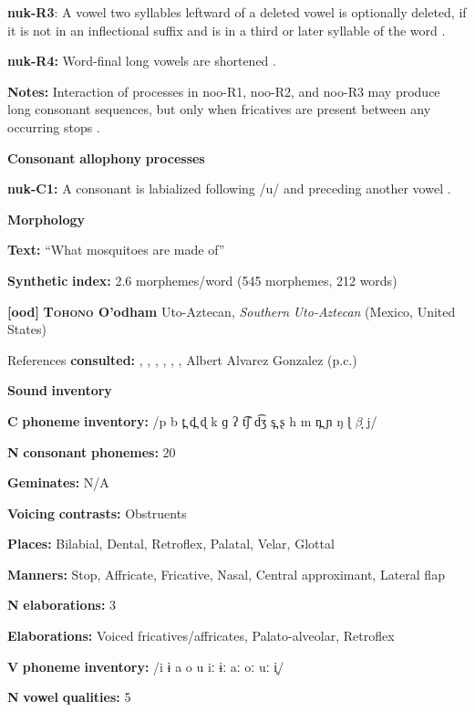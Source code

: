 \textbf{nuk-R3}: A vowel two syllables leftward of a deleted vowel is optionally deleted, if it is not in an inflectional suffix and is in a third or later syllable of the word \citep[25]{Rose1981}.

\textbf{nuk-R4:} Word-final long vowels are shortened \citep[27]{Rose1981}.

\textbf{Notes:} Interaction of processes in noo-R1, noo-R2, and noo-R3 may produce long consonant sequences, but only when fricatives are present between any occurring stops \citep[26]{Rose1981}.

\textbf{Consonant} \textbf{allophony} \textbf{processes}

\textbf{nuk-C1:} A consonant is labialized following /u/ and preceding another vowel \citep[27]{Stonham1999}.

\textbf{Morphology}

\textbf{Text:} “What mosquitoes are made of” \citep[133-143]{Stonham1999}

\textbf{Synthetic} \textbf{index:} 2.6 morphemes/word (545 morphemes, 212 words)

\textbf{[ood]}   \textbf{\textsc{Tohono} \textbf{O’odham}}  Uto-Aztecan, \textit{Southern} \textit{Uto-Aztecan} (Mexico, United States)

References \textbf{consulted:} \citet{DoloresMathiot1991}, \citet{Fitzgerald1994}, \citet{Hale1959}, \citet{HillZepeda1992}, \citet{Saxton1963}, \citet{Saxton1982}, Albert Alvarez Gonzalez (p.c.)

\textbf{Sound} \textbf{inventory}

\textbf{C} \textbf{phoneme} \textbf{inventory:} /p b t̪ d̪ ɖ k ɡ ʔ t͡ʃ d͡ʒ s̪ ʂ h m n̪ ɲ ŋ ɭ $\beta ̞$ j/

\textbf{N} \textbf{consonant} \textbf{phonemes:} 20

\textbf{Geminates:} N/A

\textbf{Voicing} \textbf{contrasts:} Obstruents

\textbf{Places:} Bilabial, Dental, Retroflex, Palatal, Velar, Glottal

\textbf{Manners:} Stop, Affricate, Fricative, Nasal, Central approximant, Lateral flap

\textbf{N} \textbf{elaborations:} 3

\textbf{Elaborations:} Voiced fricatives/affricates, Palato-alveolar, Retroflex

\textbf{V} \textbf{phoneme} \textbf{inventory:} /i ɨ a o u iː ɨː aː oː uː i̥/

\textbf{N} \textbf{vowel} \textbf{qualities:} 5


